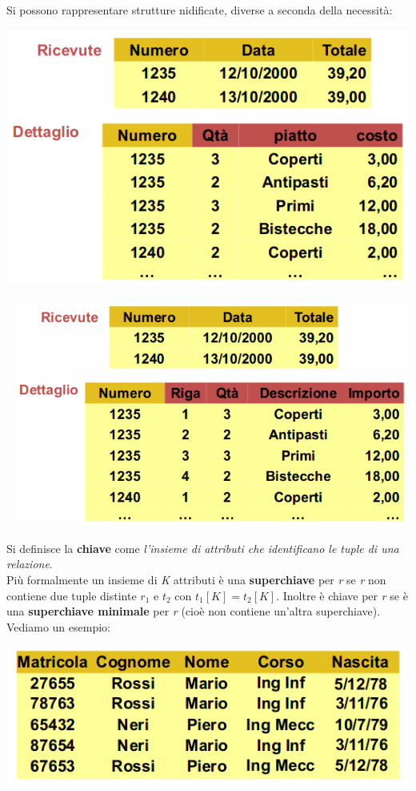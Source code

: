 \documentclass[a4paper,12pt, oneside]{book}
\begin{document}
Si possono rappresentare strutture nidificate, diverse a seconda della necessità:
\begin{center}
	\includegraphics[scale=0.7]{img/rel8.png}
\end{center}
\begin{center}
	\includegraphics[scale=0.7]{img/rel9.png}
\end{center}
Si definisce la \textbf{chiave} come \textit{l'insieme di attributi che identificano le tuple di una relazione}.\\ Più formalmente un insieme di \textit{K} attributi è una \textbf{superchiave} per \textit{r} se \textit{r} non contiene due tuple distinte $r_1$ e $t_2$ con $t_1[K] = t_2[K]$. Inoltre è chiave per \textit{r} se è una \textbf{superchiave minimale} per \textit{r} (cioè non contiene un'altra superchiave). Vediamo un esempio:
\begin{center}
	\includegraphics[scale=0.7]{img/rel10.png}
\end{center}
\end{document}
